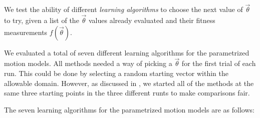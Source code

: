 We test the ability of different \emph{learning algorithms} to choose the next value of $\vec{\theta}$ to try, given a list of the
$\vec{\theta}$ values already evaluated and their fitness measurements $f(\vec{\theta})$.

We evaluated a total of seven different
learning algorithms for the parametrized motion models.  All methods
needed a way of picking a $\vec{\theta}$ for the first trial of each run.  This could be done by selecting a random starting vector within the
allowable domain.  However, as discussed in
, we started all of the methods at the same three starting points in the three different runts to make comparisons fair.


The seven learning algorithms for the parametrized motion models are as follows:






